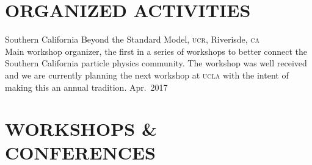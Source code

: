 \documentclass[margin,line]{resume}
\newcommand{\scap}[1]{\textsc{\MakeLowercase{#1}}}
\begin{document}
\begin{resume}
\section{\footnotesize \sc
\sffamily 
{}ORGANIZED ACTIVITIES
}

Southern California Beyond the Standard Model, \scap{UCR}, Riverisde, \scap{CA}\\
Main workshop organizer, the first in a series of workshops to better connect the Southern California particle physics community. The workshop was well received and we are currently planning the next workshop at \scap{UCLA} with the intent of making this an annual tradition.
\hfill Apr.~2017\vspace{.7mm}\\   
%









\section{\footnotesize \sc
\sffamily 
{}WORKSHOPS \&
CONFERENCES
}


\end{resume}
\end{document}
